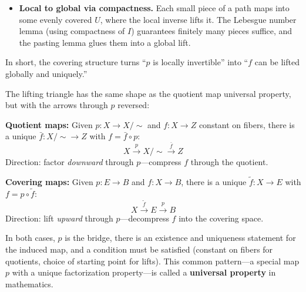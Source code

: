 \documentclass[11pt]{report}
\begin{document}
\begin{rembox}
\begin{itemize}[nosep]
    This is what drives the entire machinery:
    \[\text{disjoint slices} \;\Rightarrow\; \text{unique lift} \;\Rightarrow\; \text{endpoint well-defined} \;\Rightarrow\; \text{can distinguish homotopy classes.}\]
    Without disjointness, the endpoint $\tilde{f}(1)$ would depend on choices made during the lift, not just on $f$ and $e_0$ --- and the lifting correspondence, which converts topological questions into arithmetic, would collapse.
    \item \textbf{Local to global via compactness.} Each small piece of a path maps into some evenly covered $U$, where the local inverse lifts it. The Lebesgue number lemma (using compactness of $I$) guarantees finitely many pieces suffice, and the pasting lemma glues them into a global lift.
\end{itemize}
In short, the covering structure turns ``$p$ is locally invertible'' into ``$f$ can be lifted globally and uniquely.''
\end{rembox}

\begin{rembox}
The lifting triangle has the same shape as the quotient map universal property, but with the arrows through $p$ reversed:

\textbf{Quotient maps:} Given $p: X \to X/{\sim}$ and $f: X \to Z$ constant on fibers, there is a unique $\bar{f}: X/{\sim} \to Z$ with $f = \bar{f} \circ p$:
\[X \xrightarrow{\;p\;} X/{\sim} \xrightarrow{\;\bar{f}\;} Z\]
Direction: factor \emph{downward} through $p$---compress $f$ through the quotient.

\textbf{Covering maps:} Given $p: E \to B$ and $f: X \to B$, there is a unique $\tilde{f}: X \to E$ with $f = p \circ \tilde{f}$:
\[X \xrightarrow{\;\tilde{f}\;} E \xrightarrow{\;p\;} B\]
Direction: lift \emph{upward} through $p$---decompress $f$ into the covering space.

In both cases, $p$ is the bridge, there is an existence and uniqueness statement for the induced map, and a condition must be satisfied (constant on fibers for quotients, choice of starting point for lifts). This common pattern---a special map $p$ with a unique factorization property---is called a \textbf{universal property} in mathematics.
\end{rembox}
\end{document}
